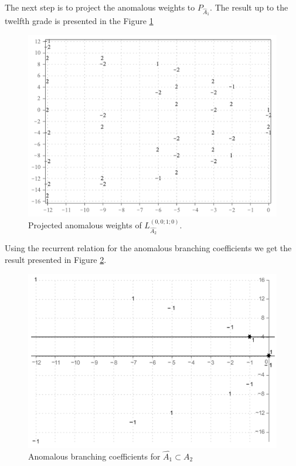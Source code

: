 \documentclass[a4paper,12pt]{article}
\theoremstyle{definition} \newtheorem{Def}{Definition}
\begin{document}
The next step is to project the anomalous weights to $P_{\hat A_1}$.
The result up to the twelfth grade is presented in the Figure \ref{fig:AffineA2_A1_anom_proj}
\begin{figure}[h!tb]
  \centering
  \includegraphics[width=130mm]{AffineA2_A1_proj_anom.pdf}
  \caption{Projected anomalous weights of $L^{(0,0;1;0)}_{\hat{A_2}}$.}
  \label{fig:AffineA2_A1_anom_proj}
\end{figure}


Using the recurrent relation for the anomalous branching coefficients we get the result presented in Figure \ref{fig:AffineA2_A1_branching}. 
\begin{figure}[h!tb]
  \centering
  \includegraphics[width=130mm]{AffineA2_A1_branching.pdf}
  \caption{Anomalous branching coefficients for $\hat{A_1}\subset \hat{A_2}$}
  \label{fig:AffineA2_A1_branching}
\end{figure}
\end{document}
